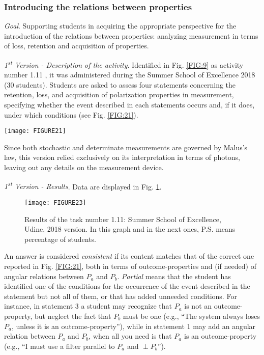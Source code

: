 \documentclass[twocolumn,secnumarabic,amssymb, nobibnotes, aps, prd, nofootinbib]{revtex4-2}
\begin{document}
\subsubsection{Introducing the relations between properties} \label{Sec:5.3.1}
\emph{Goal}. Supporting students in acquiring the appropriate perspective for the introduction of the relations between properties: analyzing measurement in terms of loss, retention and acquisition of properties.

\emph{1\textsuperscript{st} Version - Description of the activity}. Identified in Fig. \ref{FIG:9} as activity number 1.11 , it was administered during the Summer School of Excellence 2018 (30 students). Students are asked to assess four statements concerning the retention, loss, and acquisition of polarization properties in measurement, specifying whether the event described in each statements occurs and, if it does, under which conditions (see Fig. \ref{FIG:21}).
\begin{figure*}[!htpb]
       \texttt{[image: FIGURE21]}
    \caption{Identifying the possible relations between properties: Summer School of Excellence, Udine, 2018 version.}
    \label{FIG:21}
\end{figure*}
Since both stochastic and determinate measurements are governed by Malus's law, this version relied exclusively on its interpretation in terms of photons, leaving out any details on the measurement device.


\emph{1\textsuperscript{st} Version - Results}. Data are displayed in Fig. \ref{FIG:23}.
\begin{figure}[!htpb]
       \texttt{[image: FIGURE23]}
    \caption{Results of the task number 1.11: Summer School of Excellence, Udine, 2018 version. In this graph and in the next ones, P.S. means percentage of students.}
    \label{FIG:23}
\end{figure}
An answer is considered \emph{consistent} if its content matches that of the correct one reported in Fig. \ref{FIG:21}, both in terms of outcome-properties and (if needed) of angular relations between $P_a$ and $P_b$. \emph{Partial} means that the student has identified one of the conditions for the occurrence of the event described in the statement but not all of them, or that has added unneeded conditions. For instance, in statement 3 a student may recognize that $P_a$ is not an outcome-property, but neglect the fact that $P_b$ must be one (e.g., ``The system always loses $P_a$, unless it is an outcome-property''), while in statement 1 may add an angular relation between $P_a$ and $P_b$, when all you need is that $P_a$ is an outcome-property (e.g., ``I must use a filter parallel to $P_a$ and $\perp P_b$'').
\end{document}
